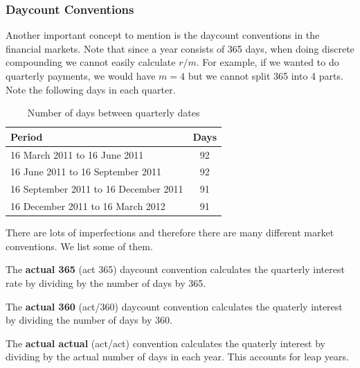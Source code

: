 \documentclass{article}
\begin{document}
    \subsubsection{Daycount Conventions}

      Another important concept to mention is the daycount conventions in the financial markets. Note that since a year consists of 365 days, when doing discrete compounding we cannot easily calculate $r/m$. For example, if we wanted to do quarterly payments, we would have $m = 4$ but we cannot split 365 into 4 parts. Note the following days in each quarter. 

      \begin{table}[H]
        \centering
        \caption{Number of days between quarterly dates}
        \label{table:quarterly_days}
        \begin{tabular}{@{}lc@{}}
        \hline
        Period                               & Days \\ \midrule
        16 March 2011 to 16 June 2011        & 92   \\
        16 June 2011 to 16 September 2011    & 92   \\
        16 September 2011 to 16 December 2011& 91   \\
        16 December 2011 to 16 March 2012    & 91   \\ \bottomrule
        \end{tabular}
      \end{table}
      
      There are lots of imperfections and therefore there are many different market conventions. We list some of them. 

      \begin{definition}[Act/365]
        The \textbf{actual 365} (act 365) daycount convention calculates the quarterly interest rate by dividing by the number of days by 365. 
      \end{definition}

      \begin{definition}[Act/360]
        The \textbf{actual 360} (act/360) daycount convention calculates the quaterly interest by dividing the number of days by 360. 
      \end{definition}

      \begin{definition}
        The \textbf{actual actual} (act/act) convention calculates the quaterly interest by dividing by the actual number of days in each year. This accounts for leap years. 
      \end{definition}    
\end{document}
